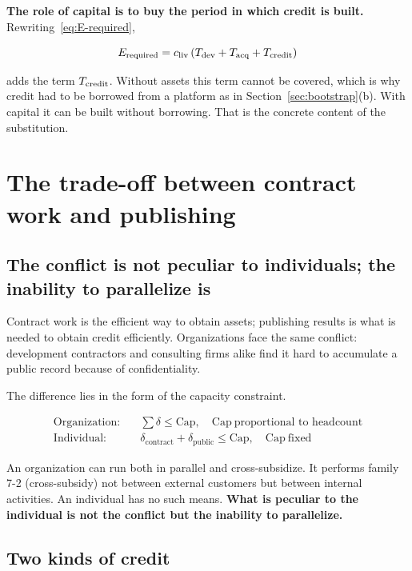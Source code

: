 \textbf{The role of capital is to buy the period in which credit is built.}
Rewriting~\eqref{eq:E-required},

\begin{equation}
E_{\rm required} = c_{\rm liv}\,(T_{\rm dev} + T_{\rm acq} + T_{\rm credit})
\label{eq:E-required-2}
\end{equation}

adds the term $T_{\rm credit}$. Without assets this term cannot be covered, which is why
credit had to be borrowed from a platform as in Section~\ref{sec:bootstrap}(b). With capital
it can be built without borrowing. That is the concrete content of the substitution.

\section{The trade-off between contract work and publishing}

\subsection{The conflict is not peculiar to individuals; the inability to parallelize is}

Contract work is the efficient way to obtain assets; publishing results is what is needed to
obtain credit efficiently. Organizations face the same conflict: development contractors and
consulting firms alike find it hard to accumulate a public record because of confidentiality.

The difference lies in the form of the capacity constraint.

\begin{align}
\text{Organization:}\quad & \sum\delta \leq \mathrm{Cap}, \quad \mathrm{Cap}\ \text{proportional to headcount} \\
\text{Individual:}\quad & \delta_{\text{contract}} + \delta_{\text{public}} \leq \mathrm{Cap}, \quad \mathrm{Cap}\ \text{fixed}
\end{align}

An organization can run both in parallel and cross-subsidize. It performs family 7-2
(cross-subsidy) not between external customers but between internal activities. An individual
has no such means.
\textbf{What is peculiar to the individual is not the conflict but the inability to
parallelize.}

\subsection{Two kinds of credit}

